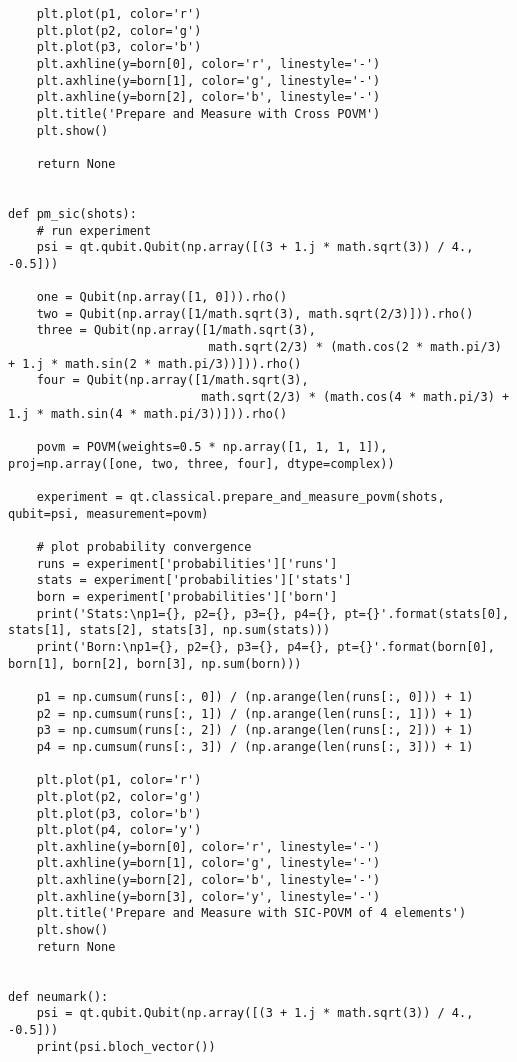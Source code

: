 \begin{verbatim}
    plt.plot(p1, color='r')
    plt.plot(p2, color='g')
    plt.plot(p3, color='b')
    plt.axhline(y=born[0], color='r', linestyle='-')
    plt.axhline(y=born[1], color='g', linestyle='-')
    plt.axhline(y=born[2], color='b', linestyle='-')
    plt.title('Prepare and Measure with Cross POVM')
    plt.show()

    return None


def pm_sic(shots):
    # run experiment
    psi = qt.qubit.Qubit(np.array([(3 + 1.j * math.sqrt(3)) / 4., -0.5]))

    one = Qubit(np.array([1, 0])).rho()
    two = Qubit(np.array([1/math.sqrt(3), math.sqrt(2/3)])).rho()
    three = Qubit(np.array([1/math.sqrt(3),
                            math.sqrt(2/3) * (math.cos(2 * math.pi/3) + 1.j * math.sin(2 * math.pi/3))])).rho()
    four = Qubit(np.array([1/math.sqrt(3),
                           math.sqrt(2/3) * (math.cos(4 * math.pi/3) + 1.j * math.sin(4 * math.pi/3))])).rho()

    povm = POVM(weights=0.5 * np.array([1, 1, 1, 1]), proj=np.array([one, two, three, four], dtype=complex))

    experiment = qt.classical.prepare_and_measure_povm(shots, qubit=psi, measurement=povm)

    # plot probability convergence
    runs = experiment['probabilities']['runs']
    stats = experiment['probabilities']['stats']
    born = experiment['probabilities']['born']
    print('Stats:\np1={}, p2={}, p3={}, p4={}, pt={}'.format(stats[0], stats[1], stats[2], stats[3], np.sum(stats)))
    print('Born:\np1={}, p2={}, p3={}, p4={}, pt={}'.format(born[0], born[1], born[2], born[3], np.sum(born)))

    p1 = np.cumsum(runs[:, 0]) / (np.arange(len(runs[:, 0])) + 1)
    p2 = np.cumsum(runs[:, 1]) / (np.arange(len(runs[:, 1])) + 1)
    p3 = np.cumsum(runs[:, 2]) / (np.arange(len(runs[:, 2])) + 1)
    p4 = np.cumsum(runs[:, 3]) / (np.arange(len(runs[:, 3])) + 1)

    plt.plot(p1, color='r')
    plt.plot(p2, color='g')
    plt.plot(p3, color='b')
    plt.plot(p4, color='y')
    plt.axhline(y=born[0], color='r', linestyle='-')
    plt.axhline(y=born[1], color='g', linestyle='-')
    plt.axhline(y=born[2], color='b', linestyle='-')
    plt.axhline(y=born[3], color='y', linestyle='-')
    plt.title('Prepare and Measure with SIC-POVM of 4 elements')
    plt.show()
    return None


def neumark():
    psi = qt.qubit.Qubit(np.array([(3 + 1.j * math.sqrt(3)) / 4., -0.5]))
    print(psi.bloch_vector())


\end{verbatim}
